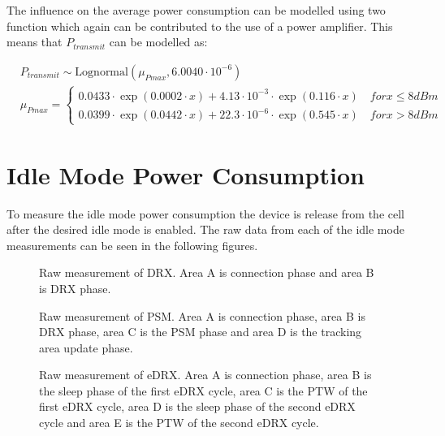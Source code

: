 The influence on the average power consumption can be modelled using two function which again can be contributed to the use of a power amplifier. This means that $P_{transmit}$ can be modelled as:

\begin{align}
&P_{transmit} \sim \text{Lognormal}(\mu_{Pmax},6.0040\cdot 10^{-6}) \\ \nonumber
&\mu_{Pmax} = \begin{cases} 0.0433\cdot\exp{(0.0002\cdot x)} + 4.13\cdot10^{-3}\cdot\exp{(0.116\cdot x)} \quad for x \leq 8 dBm \\
0.0399\cdot\exp{(0.0442\cdot x)} + 22.3\cdot10^{-6}\cdot\exp{(0.545\cdot x)} \quad for x > 8 dBm \end{cases}
\end{align}


\section{Idle Mode Power Consumption}
To measure the idle mode power consumption the device is release from the cell after the desired idle mode is enabled. The raw data from each of the idle mode measurements can be seen in the following figures.

\begin{minipage}{0.48\textwidth}
\begin{figure}[H]
\centering
\resizebox{\textwidth}{!}{
}
\caption{Raw measurement of \gls{DRX}. Area A is connection phase and area B is DRX phase.}
\label{fig:DRX}
\end{figure}
\vspace{0.8em}
\end{minipage}%
\hfill
\begin{minipage}{0.48\textwidth}
\begin{figure}[H]
\centering
\resizebox{\textwidth}{!}{
}
\caption{Raw measurement of \gls{PSM}. Area A is connection phase, area B is DRX phase, area C is the PSM phase and area D is the tracking area update phase.}
\label{fig:PSM}
\end{figure}
\end{minipage}
\vspace{1em}
\begin{figure}[H]
\centering
\begin{minipage}{0.48\textwidth}
\resizebox{\textwidth}{!}{
}
\caption{Raw measurement of \gls{eDRX}. Area A is connection phase, area B is the sleep phase of the first eDRX cycle, area C is the \gls{PTW} of the first eDRX cycle, area D is the sleep phase of the second eDRX cycle and area E is the \gls{PTW} of the second eDRX cycle.}
\label{fig:eDRX1}
\end{minipage}
\end{figure}

